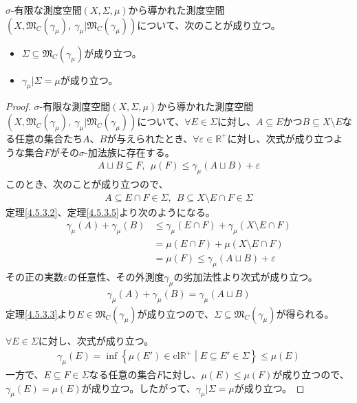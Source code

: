 \documentclass[dvipdfmx]{jsarticle}
\begin{document}
\begin{thm}\label{4.5.3.24}
$\sigma$-有限な測度空間$(X,\varSigma,\mu)$から導かれた測度空間$\left( X,\mathfrak{M}_{C}\left( \gamma_{\mu} \right),\ \gamma_{\mu}|\mathfrak{M}_{C}\left( \gamma_{\mu} \right) \right)$について、次のことが成り立つ。
\begin{itemize}
\item
  $\varSigma \subseteq \mathfrak{M}_{C}\left( \gamma_{\mu} \right)$が成り立つ。
\item
  $\gamma_{\mu}|\varSigma = \mu$が成り立つ。
\end{itemize}
\end{thm}
\begin{proof}
$\sigma$-有限な測度空間$(X,\varSigma,\mu)$から導かれた測度空間$\left( X,\mathfrak{M}_{C}\left( \gamma_{\mu} \right),\ \gamma_{\mu}|\mathfrak{M}_{C}\left( \gamma_{\mu} \right) \right)$について、$\forall E \in \varSigma$に対し、$A \subseteq E$かつ$B \subseteq X \setminus E$なる任意の集合たち$A$、$B$が与えられたとき、$\forall\varepsilon \in \mathbb{R}^{+}$に対し、次式が成り立つような集合$F$がその$\sigma$-加法族に存在する。
\begin{align*}
A \sqcup B \subseteq F,\ \ \mu(F) \leq \gamma_{\mu}(A \sqcup B) + \varepsilon
\end{align*}
このとき、次のことが成り立つので、
\begin{align*}
A \subseteq E \cap F \in \varSigma,\ \ B \subseteq X \setminus E \cap F \in \varSigma
\end{align*}
定理\ref{4.5.3.2}、定理\ref{4.5.3.5}より次のようになる。
\begin{align*}
\gamma_{\mu}(A) + \gamma_{\mu}(B) &\leq \gamma_{\mu}(E \cap F) + \gamma_{\mu}(X \setminus E \cap F)\\
&= \mu(E \cap F) + \mu(X \setminus E \cap F)\\
&= \mu(F) \leq \gamma_{\mu}(A \sqcup B) + \varepsilon
\end{align*}
その正の実数$\varepsilon$の任意性、その外測度$\gamma_{\mu}$の劣加法性より次式が成り立つ。
\begin{align*}
\gamma_{\mu}(A) + \gamma_{\mu}(B) = \gamma_{\mu}(A \sqcup B)
\end{align*}
定理\ref{4.5.3.3}より$E \in \mathfrak{M}_{C}\left( \gamma_{\mu} \right)$が成り立つので、$\varSigma \subseteq \mathfrak{M}_{C}\left( \gamma_{\mu} \right)$が得られる。\par
$\forall E \in \varSigma$に対し、次式が成り立つ。
\begin{align*}
\gamma_{\mu}(E) = \inf\left\{ \mu\left( E' \right) \in \mathrm{cl}\mathbb{R}^{+} \middle| E \subseteq E' \in \varSigma \right\} \leq \mu(E)
\end{align*}
一方で、$E \subseteq F \in \varSigma$なる任意の集合$F$に対し、$\mu(E) \leq \mu(F)$が成り立つので、$\gamma_{\mu}(E) = \mu(E)$が成り立つ。したがって、$\gamma_{\mu}|\varSigma = \mu$が成り立つ。
\end{proof}
\end{document}
